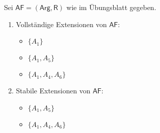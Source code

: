 Sei $\mathsf{AF}=(\mathsf{Arg}, \mathsf{R})$ wie im Übungsblatt gegeben.

\begin{enumerate}[label=\alph*)]
	\item Vollständige Extensionen von $\mathsf{AF}$:
	\begin{itemize}
		\item $\{A_1\}$
		\item $\{A_1, A_5\}$
		\item $\{A_1, A_4, A_6\}$
	\end{itemize}
	
	\item Stabile Extensionen von $\mathsf{AF}$:
	\begin{itemize}
		\item $\{A_1, A_5\}$
		\item $\{A_1, A_4, A_6\}$
	\end{itemize}
\end{enumerate}